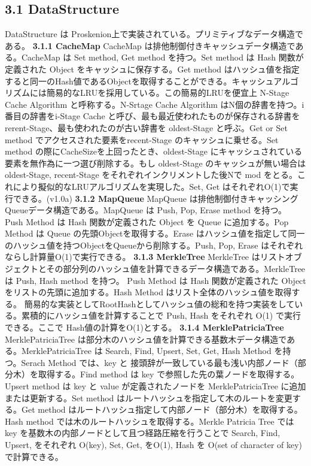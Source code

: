 \hypertarget{datastructure}{%
\subsection{\texorpdfstring{3.1
\textbf{DataStructure}}{3.1 DataStructure}}\label{datastructure}}

DataStructure は
Proskenion上で実装されている。プリミティブなデータ構造である。
\textbf{3.1.1 CacheMap} CacheMap
は排他制御付きキャッシュデータ構造である。CacheMap は Set method, Get
method を持つ。Set method は Hash 関数が定義された Object
をキャッシュに保存する。Get method
はハッシュ値を指定すると同一のHash値であるObjectを取得することができる。キャッシュアルゴリズムには簡易的なLRUを採用している。この簡易的LRUを便宜上
N-Stage Cache Algorithm と呼称する。N-Srtage Cache Algorithm
はN個の辞書を持つ。i番目の辞書をi-Stage Cache
と呼び、最も最近使われたものが保存される辞書を
rerent-Stage、最も使われたのが古い辞書を oldest-Stage と呼ぶ。Get or Set
method でアクセスされた要素をrecent-Stage のキャッシュに乗せる。Set
method の際にCacheSizeを上回ったとき、oldest-Stage
にキャッシュされている要素を無作為に一つ選び削除する。もし oldest-Stage
のキャッシュが無い場合は oldest-Stage, recent-Stage
をそれぞれインクリメントした後Nで mod
をとる。これにより擬似的なLRUアルゴリズムを実現した。Set, Get
はそれぞれO(1)で実行できる。(v1.0a) \textbf{3.1.2 MapQueue} MapQueue
は排他制御付きキャッシングQueueデータ構造である。MapQueue は Push, Pop,
Erase method を持つ。 Push Method は Hash 関数が定義された Object を
Queue に追加する。Pop Method は Queue の先頭Objectを取得する。Erase
はハッシュ値を指定して同一のハッシュ値を持つObjectをQueueから削除する。Push,
Pop, Erase はそれぞれならし計算量O(1)で実行できる。 \textbf{3.1.3
MerkleTree} MerkleTree
はリストオブジェクトとその部分列のハッシュ値を計算できるデータ構造である。MerkleTree
は Push, Hash method を持つ。 Push Method は Hash 関数が定義された
Object をリストの先頭に追加する。Hash Method
はリスト全体のハッシュ値を取得する。
簡易的な実装としてRootHashとしてハッシュ値の総和を持つ実装をしている。累積的にハッシュ値を計算することで
Push, Hash をそれぞれ O(1) で実行できる。ここで
Hash値の計算をO(1)とする。 \textbf{3.1.4 MerklePatriciaTree}
MerklePatriciaTree
は部分木のハッシュ値を計算できる基数木データ構造である。MerklePatriciaTree
は Search, Find, Upsert, Set, Get, Hash Method を持つ。Serach Method
では、key と
接頭辞が一致している最も浅い内部ノード（部分木）を取得する。Find method
は key で参照した先の葉ノードを取得する。Upsert method は key と value
が定義されたノードを MerklePatriciaTree に追加または更新する。Set method
はルートハッシュを指定して木のルートを変更する。Get method
はルートハッシュ指定して内部ノード（部分木）を取得する。Hash method
では木のルートハッシュを取得する。Merkle Patricia Tree では key
を基数木の内部ノードとして且つ経路圧縮を行うことで Search, Find, Upsert,
をそれぞれ O(\textbar key\textbar), Set, Get, をO(1), Hash を
O(\textbar set of character of key\textbar) で計算できる。

